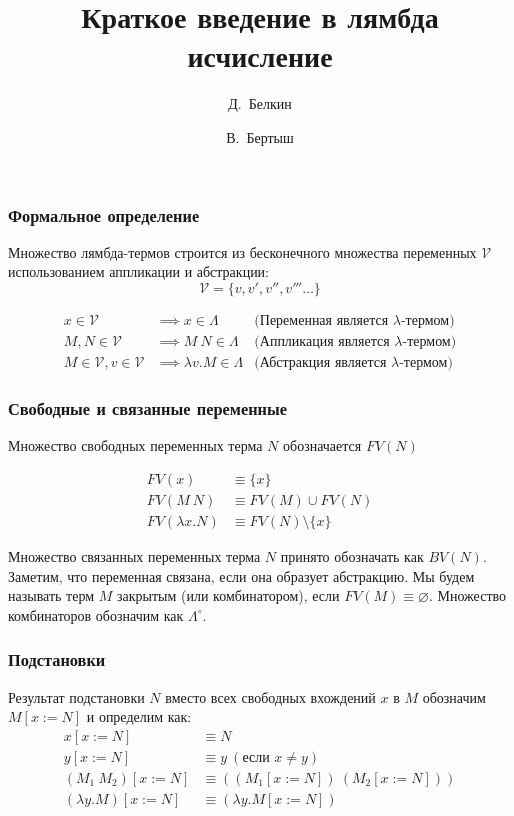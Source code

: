 \documentclass{beamer}
\title[Лямбда исчисление]{Краткое введение в лямбда исчисление}
\author[Белкин, Бертыш]{Д.~Белкин \and В.~Бертыш}
\begin{document}
\frame{\titlepage}

\begin{frame}\frametitle{Формальное определение}

Множество лямбда-термов строится из бесконечного множества переменных $\mathcal{V}$ использованием аппликации и абстракции:
\[\mathcal{V} = \{ v, v', v'', v''' \dots \}\]

\begin{align*}
	x \in \mathcal{V} & \implies x \in \Lambda &\text{(Переменная является $\lambda$-термом)}\\
	M, N \in \mathcal{V} & \implies M\ N \in \Lambda &\text{(Аппликация является $\lambda$-термом)}\\
	M \in \mathcal{V}, v \in \mathcal{V} & \implies \lambda v.M \in \Lambda &\text{(Абстракция является $\lambda$-термом)}
\end{align*}

\end{frame}

\begin{frame}\frametitle{Свободные и связанные переменные}

Множество свободных переменных терма $N$ обозначается $FV(N)$

\begin{align*}
	FV(x) 			&\equiv \{x\}\\
	FV(M\ N) 		&\equiv FV(M)\cup FV(N)\\
	FV(\lambda x.N) &\equiv FV(N)\setminus\{x\}
\end{align*}
    
Множество связанных переменных терма $N$ принято обозначать как $BV(N)$.
Заметим, что переменная связана, если она образует абстракцию.
Мы будем называть терм $M$ закрытым (или комбинатором), если \(FV(M) \equiv \varnothing\).
Множество комбинаторов обозначим как $\Lambda^\circ$.

\end{frame}

\begin{frame}\frametitle{Подстановки}
    
Результат подстановки $N$ вместо всех свободных вхождений $x$ в $M$ обозначим $M[x := N]$ и определим как:
\begin{align*}
	x[x := N] &\equiv N\\
	y[x := N] &\equiv y\ (\text{если } x \neq y)\\
	(M_1 \ M_2 )[x := N] &\equiv ((M_1 [x := N])\ (M_2 [x := N]))\\
	(\lambda y.M)[x := N] &\equiv (\lambda y.M[x := N])
\end{align*}

\end{frame}
\end{document}
